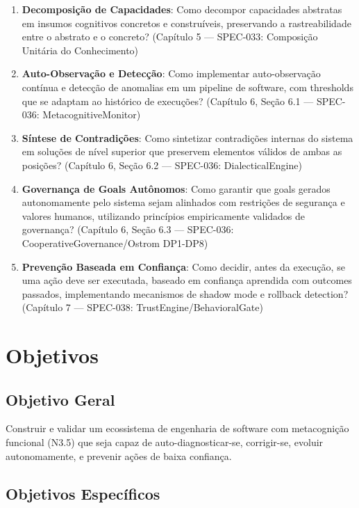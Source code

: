 \begin{enumerate}[label=\textbf{QP\arabic*:}]
    \item \textbf{Decomposição de Capacidades}: Como decompor capacidades abstratas em insumos cognitivos concretos e construíveis, preservando a rastreabilidade entre o abstrato e o concreto? (Capítulo 5 — SPEC-033: Composição Unitária do Conhecimento)
    \item \textbf{Auto-Observação e Detecção}: Como implementar auto-observação contínua e detecção de anomalias em um pipeline de software, com thresholds que se adaptam ao histórico de execuções? (Capítulo 6, Seção 6.1 — SPEC-036: MetacognitiveMonitor)
    \item \textbf{Síntese de Contradições}: Como sintetizar contradições internas do sistema em soluções de nível superior que preservem elementos válidos de ambas as posições? (Capítulo 6, Seção 6.2 — SPEC-036: DialecticalEngine)
    \item \textbf{Governança de Goals Autônomos}: Como garantir que goals gerados autonomamente pelo sistema sejam alinhados com restrições de segurança e valores humanos, utilizando princípios empiricamente validados de governança? (Capítulo 6, Seção 6.3 — SPEC-036: CooperativeGovernance/Ostrom DP1-DP8)
    \item \textbf{Prevenção Baseada em Confiança}: Como decidir, antes da execução, se uma ação deve ser executada, baseado em confiança aprendida com outcomes passados, implementando mecanismos de shadow mode e rollback detection? (Capítulo 7 — SPEC-038: TrustEngine/BehavioralGate)
\end{enumerate}

\section{Objetivos}

\subsection{Objetivo Geral}

Construir e validar um ecossistema de engenharia de software com metacognição funcional (N3.5) que seja capaz de auto-diagnosticar-se, corrigir-se, evoluir autonomamente, e prevenir ações de baixa confiança.

\subsection{Objetivos Específicos}

